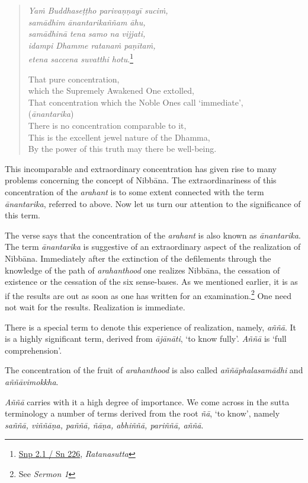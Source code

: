 \begin{quote}
\emph{Yaṁ Buddhaseṭṭho parivaṇṇayī suciṁ,}\\
\emph{samādhim ānantarikaññam āhu,}\\
\emph{samādhinā tena samo na vijjati,}\\
\emph{idampi Dhamme ratanaṁ paṇītaṁ,}\\
\emph{etena saccena suvatthi hotu}.\footnote{\href{https://suttacentral.net/snp2.1/pli/ms}{Snp 2.1 / Sn 226}, \emph{Ratanasutta}}

That pure concentration,\\
\vin which the Supremely Awakened One extolled,\\
That concentration which the Noble Ones call `immediate',\\
\vin (\emph{ānantarika})\\
There is no concentration comparable to it,\\
This is the excellent jewel nature of the Dhamma,\\
By the power of this truth may there be well-being.
\end{quote}

This incomparable and extraordinary concentration has given rise to many problems concerning the concept of Nibbāna. The extraordinariness of this concentration of the \emph{arahant} is to some extent connected with the term \emph{ānantarika}, referred to above. Now let us turn our attention to the significance of this term.

The verse says that the concentration of the \emph{arahant} is also known as \emph{ānantarika}. The term \emph{ānantarika} is suggestive of an extraordinary aspect of the realization of Nibbāna. Immediately after the extinction of the defilements through the knowledge of the path of \emph{arahanthood} one realizes Nibbāna, the cessation of existence or the cessation of the six sense-bases. As we mentioned earlier, it is as if the results are out as soon as one has written for an examination.\footnote{See \emph{Sermon 1}} One need not wait for the results. Realization is immediate.

There is a special term to denote this experience of realization, namely, \emph{aññā}. It is a highly significant term, derived from \emph{ājānāti}, `to know fully'. \emph{Aññā} is `full comprehension'.

The concentration of the fruit of \emph{arahanthood} is also called \emph{aññāphalasamādhi} and \emph{aññāvimokkha}.

\emph{Aññā} carries with it a high degree of importance. We come across in the sutta terminology a number of terms derived from the root \emph{ñā}, `to know', namely \emph{saññā, viññāṇa, paññā, ñāṇa, abhiññā, pariññā, aññā}.

